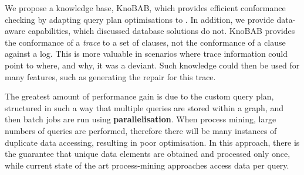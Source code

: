 We propose a knowledge base, KnoBAB, which provides efficient conformance checking by adapting query plan optimisations \cite{BellatrecheKB21} to \LTLf. In addition, we provide data-aware capabilities, which discussed database solutions do not. KnoBAB provides the conformance of a \emph{trace} to a set of clauses, not the conformance of a clause against a log. This is more valuable in scenarios where trace information could point to where, and why, it was a deviant. Such knowledge could then be used for many features, such as generating the repair for this trace.
\medskip
 

The greatest amount of performance gain is due to the custom query plan, structured in such a way that multiple queries are stored within a graph, and then batch jobs are run using \textbf{parallelisation}. When process mining, large numbers of queries are performed, therefore there will be many instances of duplicate data accessing, resulting in poor optimisation. In this approach, there is the guarantee that unique data elements are obtained and processed only once, while current state of the art process-mining approaches access data per query. 

